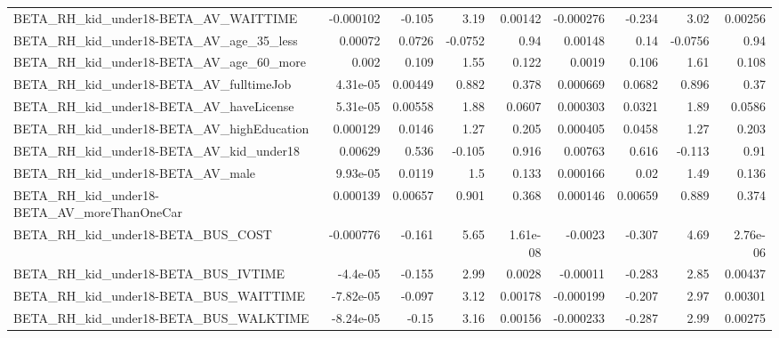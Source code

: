 \begin{tabular}{lrrrrrrrr}
BETA\_RH\_kid\_under18-BETA\_AV\_WAITTIME               &   -0.000102 &       -0.105 &     3.19 &  0.00142 &  -0.000276 &      -0.234 &         3.02 &       0.00256 \\
BETA\_RH\_kid\_under18-BETA\_AV\_age\_35\_less            &     0.00072 &       0.0726 &  -0.0752 &     0.94 &    0.00148 &        0.14 &      -0.0756 &          0.94 \\
BETA\_RH\_kid\_under18-BETA\_AV\_age\_60\_more            &       0.002 &        0.109 &     1.55 &    0.122 &     0.0019 &       0.106 &         1.61 &         0.108 \\
BETA\_RH\_kid\_under18-BETA\_AV\_fulltimeJob            &    4.31e-05 &      0.00449 &    0.882 &    0.378 &   0.000669 &      0.0682 &        0.896 &          0.37 \\
BETA\_RH\_kid\_under18-BETA\_AV\_haveLicense            &    5.31e-05 &      0.00558 &     1.88 &   0.0607 &   0.000303 &      0.0321 &         1.89 &        0.0586 \\
BETA\_RH\_kid\_under18-BETA\_AV\_highEducation          &    0.000129 &       0.0146 &     1.27 &    0.205 &   0.000405 &      0.0458 &         1.27 &         0.203 \\
BETA\_RH\_kid\_under18-BETA\_AV\_kid\_under18            &     0.00629 &        0.536 &   -0.105 &    0.916 &    0.00763 &       0.616 &       -0.113 &          0.91 \\
BETA\_RH\_kid\_under18-BETA\_AV\_male                   &    9.93e-05 &       0.0119 &      1.5 &    0.133 &   0.000166 &        0.02 &         1.49 &         0.136 \\
BETA\_RH\_kid\_under18-BETA\_AV\_moreThanOneCar         &    0.000139 &      0.00657 &    0.901 &    0.368 &   0.000146 &     0.00659 &        0.889 &         0.374 \\
BETA\_RH\_kid\_under18-BETA\_BUS\_COST                  &   -0.000776 &       -0.161 &     5.65 & 1.61e-08 &    -0.0023 &      -0.307 &         4.69 &      2.76e-06 \\
BETA\_RH\_kid\_under18-BETA\_BUS\_IVTIME                &    -4.4e-05 &       -0.155 &     2.99 &   0.0028 &   -0.00011 &      -0.283 &         2.85 &       0.00437 \\
BETA\_RH\_kid\_under18-BETA\_BUS\_WAITTIME              &   -7.82e-05 &       -0.097 &     3.12 &  0.00178 &  -0.000199 &      -0.207 &         2.97 &       0.00301 \\
BETA\_RH\_kid\_under18-BETA\_BUS\_WALKTIME              &   -8.24e-05 &        -0.15 &     3.16 &  0.00156 &  -0.000233 &      -0.287 &         2.99 &       0.00275 \\

\end{tabular}
